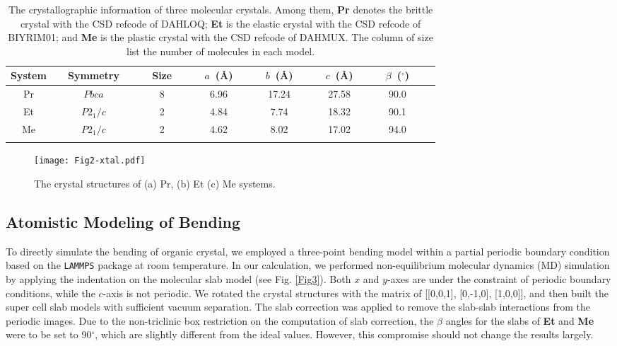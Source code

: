 \documentclass[prb,superscriptaddress,longbibliography, twocolumn]{revtex4-1}
\begin{document}
\begin{table}[ht]
  \centering
  \caption{The crystallographic information of three molecular crystals. Among them, \textbf{Pr} denotes the brittle crystal with the CSD refcode of DAHLOQ; \textbf{Et} is the elastic crystal with the CSD refcode of BIYRIM01; and \textbf{Me} is the plastic crystal with the CSD refcode of DAHMUX. The column of size list the number of molecules in each model.}
\begin{tabular}{cccccccc}
\hline\hline
System&~~Symmetry~~&  ~~Size~~ &~~$a$~(\AA)~~&~~$b$~(\AA)~~&~~$c$~(\AA)~~&~~$\beta$~($^\circ$)~~\\ \hline
Pr     & $Pbca$        & 8                   & 6.96  & 17.24  & 27.58 & 90.0  \\ 
Et     & $P2_1/c$       & 2                  & 4.84  & 7.74   & 18.32 & 90.1  \\ 
Me     & $P2_1/c$       & 2                  & 4.62  & 8.02   & 17.02 & 94.0  \\ 
\hline\hline
\label{table1}
\end{tabular}
\end{table}
\begin{figure}[htbp]
\centering
\texttt{[image: Fig2-xtal.pdf]}
\caption{\label{Fig2} The crystal structures of (a) Pr, (b) Et (c) Me systems.}
\end{figure}

\subsection{Atomistic Modeling of Bending}
To directly simulate the bending of organic crystal, we employed a three-point bending model within a partial periodic boundary condition based on the \texttt{LAMMPS} package \cite{lammps} at room temperature. In our calculation, we performed non-equilibrium molecular dynamics (MD) simulation by applying the indentation on the molecular slab model (see Fig. \ref{Fig3}). Both $x$ and $y$-axes are under the constraint of periodic boundary conditions, while the $c$-axis is not periodic. We rotated the crystal structures with the matrix of [[0,0,1], [0,-1,0], [1,0,0]], and then built the super cell slab models with sufficient vacuum separation. The slab correction was applied to remove the slab-slab interactions from the periodic images. Due to the non-triclinic box restriction on the computation of slab correction, the $\beta$ angles for the slabs of \textbf{Et} and \textbf{Me} were to be set to 90$^\circ$, which are slightly different from the ideal values. However, this compromise should not change the results largely. 
\end{document}
